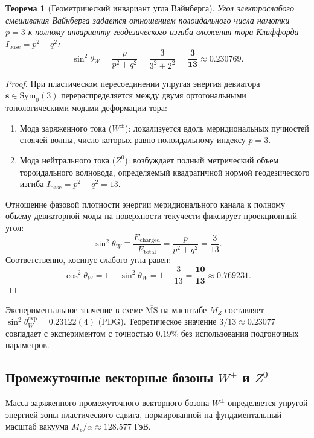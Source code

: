 \documentclass[11pt,a4paper]{article}
\newtheorem{theorem}{Теорема}[section]
\theoremstyle{definition}
\theoremstyle{remark}
\begin{document}
\begin{theorem}[Геометрический инвариант угла Вайнберга]
Угол электрослабого смешивания Вайнберга задается отношением полоидального числа намотки $p=3$ к полному инварианту геодезического изгиба вложения тора Клиффорда $I_{\mathrm{base}} = p^2 + q^2$:
\begin{equation}
    \sin^2\theta_W = \frac{p}{p^2 + q^2} = \frac{3}{3^2 + 2^2} = \boldsymbol{\frac{3}{13}} \approx 0.230769.
    \label{eq:weinberg_exact}
\end{equation}
\end{theorem}

\begin{proof}
При пластическом пересоединении упругая энергия девиатора $\mathbf{s} \in \mathrm{Sym}_0(3)$ перераспределяется между двумя ортогональными топологическими модами деформации тора:
\begin{enumerate}
    \item Мода заряженного тока ($W^\pm$): локализуется вдоль меридиональных пучностей стоячей волны, число которых равно полоидальному индексу $p = 3$.
    \item Мода нейтрального тока ($Z^0$): возбуждает полный метрический объем тороидального волновода, определяемый квадратичной нормой геодезического изгиба $I_{\mathrm{base}} = p^2 + q^2 = 13$.
\end{enumerate}
Отношение фазовой плотности энергии меридионального канала к полному объему девиаторной моды на поверхности текучести фиксирует проекционный угол:
\begin{equation}
    \sin^2\theta_W \equiv \frac{E_{\mathrm{charged}}}{E_{\mathrm{total}}} = \frac{p}{p^2 + q^2} = \frac{3}{13}.
\end{equation}
Соответственно, косинус слабого угла равен:
\begin{equation}
    \cos^2\theta_W = 1 - \sin^2\theta_W = 1 - \frac{3}{13} = \boldsymbol{\frac{10}{13}} \approx 0.769231.
\end{equation}
\end{proof}

Экспериментальное значение в схеме $\overline{\mathrm{MS}}$ на масштабе $M_Z$ составляет $\sin^2\theta_W^{\mathrm{exp}} = 0.23122(4)$ (PDG). Теоретическое значение $3/13 \approx 0.23077$ совпадает с экспериментом с точностью $0.19\%$ без использования подгоночных параметров.

\subsection{Промежуточные векторные бозоны $W^\pm$ и $Z^0$}
Масса заряженного промежуточного векторного бозона $W^\pm$ определяется упругой энергией зоны пластического сдвига, нормированной на фундаментальный масштаб вакуума $M_p / \alpha \approx 128.577\text{ ГэВ}$.
\end{document}
